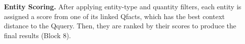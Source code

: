 


\noindent \textbf{Entity Scoring.}
After applying entity-type and quantity filters, each entity is assigned a score from one of its linked Qfacts, which has the best context distance to the Qquery. Then, they are ranked by their scores to produce the final results (Block 8).
